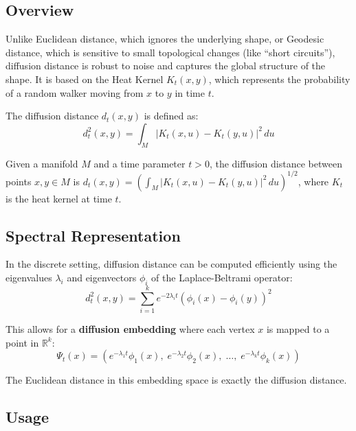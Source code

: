 \subsection{Overview}

Unlike Euclidean distance, which ignores the underlying shape, or Geodesic distance, which is sensitive to small topological changes (like ``short circuits''), diffusion distance is robust to noise and captures the global structure of the shape. It is based on the Heat Kernel $K_t(x, y)$, which represents the probability of a random walker moving from $x$ to $y$ in time $t$.

The diffusion distance $d_t(x, y)$ is defined as:
$$d_t^2(x, y) = \int_M |K_t(x, u) - K_t(y, u)|^2 \, du$$

\begin{definition}\label{def:diffusion_distance}
Given a manifold $M$ and a time parameter $t > 0$, the diffusion distance between points $x, y \in M$ is $d_t(x,y) = \left(\int_M |K_t(x,u) - K_t(y,u)|^2 \, du\right)^{1/2}$, where $K_t$ is the heat kernel at time $t$.
\end{definition}

\subsection{Spectral Representation}

In the discrete setting, diffusion distance can be computed efficiently using the eigenvalues $\lambda_i$ and eigenvectors $\phi_i$ of the Laplace-Beltrami operator:
$$d_t^2(x, y) = \sum_{i=1}^k e^{-2\lambda_i t} (\phi_i(x) - \phi_i(y))^2$$

This allows for a \textbf{diffusion embedding} where each vertex $x$ is mapped to a point in $\mathbb{R}^k$:
$$\Psi_t(x) = \left(e^{-\lambda_1 t}\phi_1(x),\; e^{-\lambda_2 t}\phi_2(x),\; \dots,\; e^{-\lambda_k t}\phi_k(x)\right)$$

The Euclidean distance in this embedding space is exactly the diffusion distance.

\subsection{Usage}

